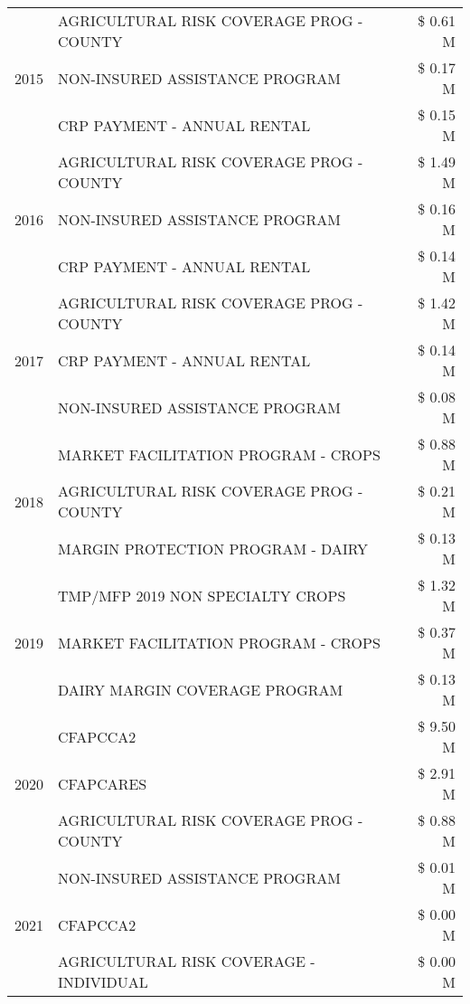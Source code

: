 \begin{tabular}{llr}
\multirow[t]{3}{*}{2015} & AGRICULTURAL RISK COVERAGE PROG - COUNTY & \$ 0.61 M \\
 & NON-INSURED ASSISTANCE PROGRAM & \$ 0.17 M \\
 & CRP PAYMENT - ANNUAL RENTAL & \$ 0.15 M \\
\cline{1-3}
\multirow[t]{3}{*}{2016} & AGRICULTURAL RISK COVERAGE PROG - COUNTY & \$ 1.49 M \\
 & NON-INSURED ASSISTANCE PROGRAM & \$ 0.16 M \\
 & CRP PAYMENT - ANNUAL RENTAL & \$ 0.14 M \\
\cline{1-3}
\multirow[t]{3}{*}{2017} & AGRICULTURAL RISK COVERAGE PROG - COUNTY & \$ 1.42 M \\
 & CRP PAYMENT - ANNUAL RENTAL & \$ 0.14 M \\
 & NON-INSURED ASSISTANCE PROGRAM & \$ 0.08 M \\
\cline{1-3}
\multirow[t]{3}{*}{2018} & MARKET FACILITATION PROGRAM - CROPS & \$ 0.88 M \\
 & AGRICULTURAL RISK COVERAGE PROG - COUNTY & \$ 0.21 M \\
 & MARGIN PROTECTION PROGRAM - DAIRY & \$ 0.13 M \\
\cline{1-3}
\multirow[t]{3}{*}{2019} & TMP/MFP 2019 NON SPECIALTY CROPS & \$ 1.32 M \\
 & MARKET FACILITATION PROGRAM - CROPS & \$ 0.37 M \\
 & DAIRY MARGIN COVERAGE PROGRAM & \$ 0.13 M \\
\cline{1-3}
\multirow[t]{3}{*}{2020} & CFAPCCA2 & \$ 9.50 M \\
 & CFAPCARES & \$ 2.91 M \\
 & AGRICULTURAL RISK COVERAGE PROG - COUNTY & \$ 0.88 M \\
\cline{1-3}
\multirow[t]{3}{*}{2021} & NON-INSURED ASSISTANCE PROGRAM & \$ 0.01 M \\
 & CFAPCCA2 & \$ 0.00 M \\
 & AGRICULTURAL RISK COVERAGE - INDIVIDUAL & \$ 0.00 M \\
\cline{1-3}
\bottomrule
\end{tabular}
